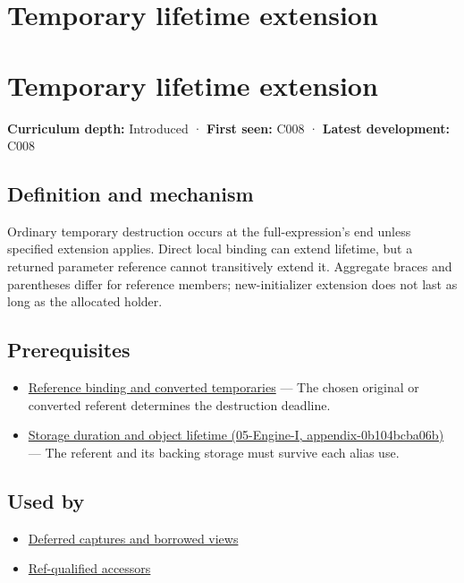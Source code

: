 \hypertarget{appendix-a978b29bbbb0}{}
\section*{Temporary lifetime extension}
\section{Temporary lifetime extension}\label{appendix-a978b29bbbb0-temporary-lifetime-extension}

\textbf{Curriculum depth:} Introduced · \textbf{First seen:} C008 · \textbf{Latest development:} C008

\subsection{Definition and mechanism}\label{appendix-a978b29bbbb0-definition-and-mechanism}

Ordinary temporary destruction occurs at the full-expression's end unless specified extension applies. Direct local binding can extend lifetime, but a returned parameter reference cannot transitively extend it. Aggregate braces and parentheses differ for reference members; new-initializer extension does not last as long as the allocated holder.

\subsection{Prerequisites}\label{appendix-a978b29bbbb0-prerequisites}

\begin{itemize}
\tightlist
\item
  \hyperref[appendix-37856d997bb0]{Reference binding and converted temporaries} --- The chosen original or converted referent determines the destruction deadline.
\item
  \href{../05-Engine-I/main.pdf\#nameddest=appendix-0b104bcba06b}{Storage duration and object lifetime (05-Engine-I, appendix-0b104bcba06b)} --- The referent and its backing storage must survive each alias use.
\end{itemize}

\subsection{Used by}\label{appendix-a978b29bbbb0-used-by}

\begin{itemize}
\tightlist
\item
  \hyperref[appendix-aea529eb5175]{Deferred captures and borrowed views}
\item
  \hyperref[appendix-d42039b1d6f7]{Ref-qualified accessors}
\end{itemize}

